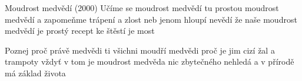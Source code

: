 \begin{TEXT}{Moudrost medvědí (2000)}
\SLOKA Učíme se moudrost medvědí
tu prostou moudrost medvědí
a zapomeňme  trápení a zlost
neb jenom hloupí nevědí
že naše moudrost medvědí
je prostý recept ke štěstí je most

\SLOKA Poznej proč právě medvědi
ti všichni moudří medvědi
proč je jim cizí žal a trampoty
vždyť v tom je moudrost medvěda
nic zbytečného nehledá
a v přírodě má základ života
\end{TEXT}